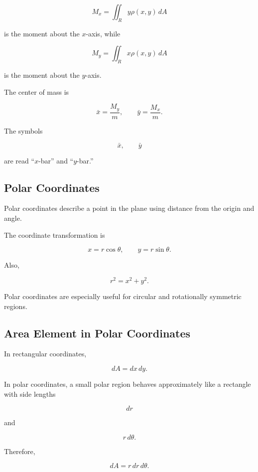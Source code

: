 \[ M_x=\iint_R y\rho(x,y)\,dA \]

is the moment about the \(x\)-axis, while

\[ M_y=\iint_R x\rho(x,y)\,dA \]

is the moment about the \(y\)-axis.

The center of mass is

\[ \bar{x}=\frac{M_y}{m},\qquad
\bar{y}=\frac{M_x}{m}. \]

The symbols

\[ \bar{x},\qquad\bar{y} \]

are read ``\(x\)-bar'' and ``\(y\)-bar.''

\subsection{Polar Coordinates}
\label{subsec:polar-coordinates-multivariable}

Polar coordinates describe a point in the plane using distance from the
origin and angle.

The coordinate transformation is

\[ x=r\cos\theta,\qquad y=r\sin\theta. \]

Also,

\[ r^2=x^2+y^2. \]

Polar coordinates are especially useful for circular and rotationally
symmetric regions.

\subsection{Area Element in Polar Coordinates}
\label{subsec:polar-area-element}

In rectangular coordinates,

\[ dA=dx\,dy. \]

In polar coordinates, a small polar region behaves approximately like a
rectangle with side lengths

\[ dr \]

and

\[ r\,d\theta. \]

Therefore,

\[ \boxed{dA=r\,dr\,d\theta.} \]

